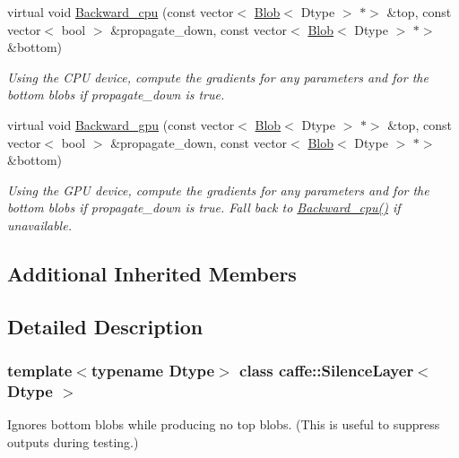 \begin{DoxyCompactItemize}
virtual void \mbox{\hyperlink{classcaffe_1_1_silence_layer_ae898e66622b7f765348fa6745c3009a0}{Backward\+\_\+cpu}} (const vector$<$ \mbox{\hyperlink{classcaffe_1_1_blob}{Blob}}$<$ Dtype $>$ $\ast$$>$ \&top, const vector$<$ bool $>$ \&propagate\+\_\+down, const vector$<$ \mbox{\hyperlink{classcaffe_1_1_blob}{Blob}}$<$ Dtype $>$ $\ast$$>$ \&bottom)
\begin{DoxyCompactList}\small\item\em Using the C\+PU device, compute the gradients for any parameters and for the bottom blobs if propagate\+\_\+down is true. \end{DoxyCompactList}\item 
\mbox{\label{classcaffe_1_1_silence_layer_a803c2b6a1064e885ef5f7bd08eabab55}} 
virtual void \mbox{\hyperlink{classcaffe_1_1_silence_layer_a803c2b6a1064e885ef5f7bd08eabab55}{Backward\+\_\+gpu}} (const vector$<$ \mbox{\hyperlink{classcaffe_1_1_blob}{Blob}}$<$ Dtype $>$ $\ast$$>$ \&top, const vector$<$ bool $>$ \&propagate\+\_\+down, const vector$<$ \mbox{\hyperlink{classcaffe_1_1_blob}{Blob}}$<$ Dtype $>$ $\ast$$>$ \&bottom)
\begin{DoxyCompactList}\small\item\em Using the G\+PU device, compute the gradients for any parameters and for the bottom blobs if propagate\+\_\+down is true. Fall back to \mbox{\hyperlink{classcaffe_1_1_silence_layer_a15ba1bd65230fda33662b23195aeaaf8}{Backward\+\_\+cpu()}} if unavailable. \end{DoxyCompactList}\end{DoxyCompactItemize}
\subsection*{Additional Inherited Members}


\subsection{Detailed Description}
\subsubsection*{template$<$typename Dtype$>$\newline
class caffe\+::\+Silence\+Layer$<$ Dtype $>$}

Ignores bottom blobs while producing no top blobs. (This is useful to suppress outputs during testing.) 

